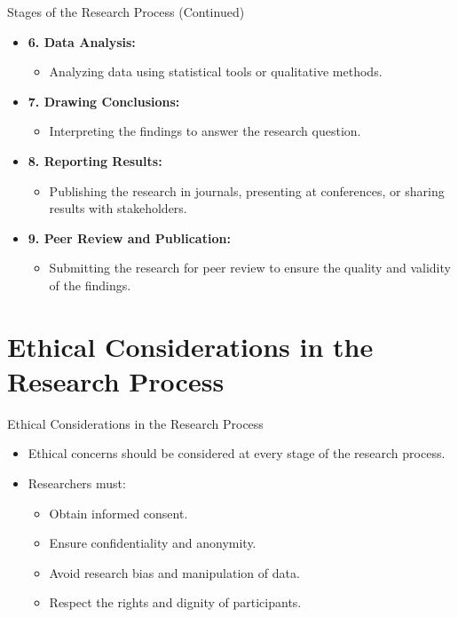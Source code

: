 \documentclass{beamer}
\begin{document}
	\begin{frame}{Stages of the Research Process (Continued)}
		\begin{itemize}
			\item \textbf{6. Data Analysis:}
			\begin{itemize}
				\item Analyzing data using statistical tools or qualitative methods.
			\end{itemize}
			\item \textbf{7. Drawing Conclusions:}
			\begin{itemize}
				\item Interpreting the findings to answer the research question.
			\end{itemize}
			\item \textbf{8. Reporting Results:}
			\begin{itemize}
				\item Publishing the research in journals, presenting at conferences, or sharing results with stakeholders.
			\end{itemize}
			\item \textbf{9. Peer Review and Publication:}
			\begin{itemize}
				\item Submitting the research for peer review to ensure the quality and validity of the findings.
			\end{itemize}
		\end{itemize}
	\end{frame}
	
	\section{Ethical Considerations in the Research Process}
	\begin{frame}{Ethical Considerations in the Research Process}
		\begin{itemize}
			\item Ethical concerns should be considered at every stage of the research process.
			\item Researchers must:
			\begin{itemize}
				\item Obtain informed consent.
				\item Ensure confidentiality and anonymity.
				\item Avoid research bias and manipulation of data.
				\item Respect the rights and dignity of participants.
			\end{itemize}
		\end{itemize}
	\end{frame}
	
\end{document}
